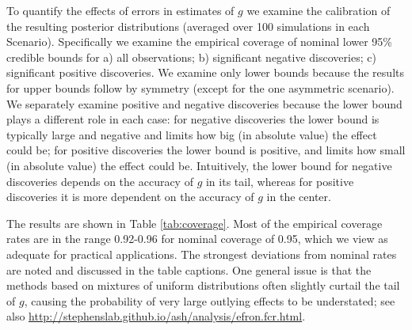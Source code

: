 \documentclass[11pt]{article}
\begin{document}
To quantify the effects of errors in estimates of $g$ we examine the calibration of the resulting posterior distributions (averaged over 100 simulations in each Scenario). 
Specifically we examine the empirical coverage of nominal lower 95\% credible bounds for a) all observations; b) significant negative discoveries; c) significant positive discoveries.  We examine only lower bounds because the results for upper bounds follow by 
symmetry (except for the one asymmetric scenario). We separately examine positive and negative discoveries because the lower bound plays a different role
in each case: for negative discoveries the lower bound is typically large and negative and limits how big (in absolute value) 
the effect could be; for positive discoveries the lower bound 
is positive, and limits how small (in absolute value) the effect could be. Intuitively, the lower bound for negative discoveries depends on the accuracy of $g$ in its tail,
whereas for positive discoveries it is more dependent on the accuracy of $g$ in the center.

The results are shown in Table \ref{tab:coverage}.  Most of the empirical coverage rates are in the range 0.92-0.96 for nominal coverage of 0.95, which we view
as adequate for practical applications. The strongest deviations from nominal rates are noted and discussed in the table captions.
One general issue is that the methods based on mixtures of uniform distributions often slightly curtail the tail of $g$, causing the probability of very large outlying effects to be understated;  see also \url{http://stephenslab.github.io/ash/analysis/efron.fcr.html}. 


\end{document}
